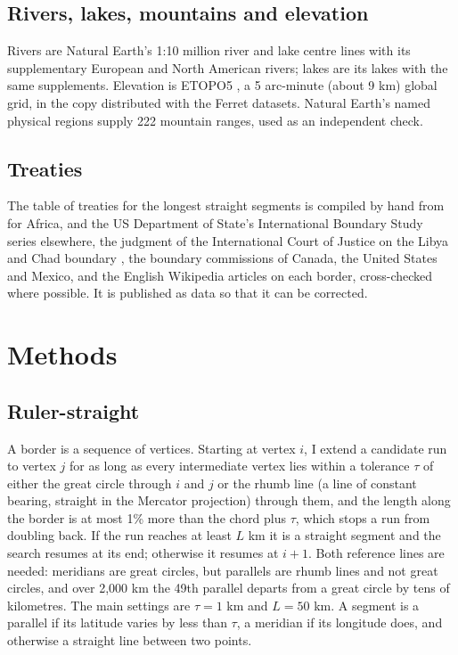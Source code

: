 \documentclass[11pt,a4paper]{article}
\begin{document}
\subsection{Rivers, lakes, mountains and elevation}
Rivers are Natural Earth's 1:10 million river and lake centre lines with its supplementary European and North American rivers; lakes are its lakes with the same supplements. Elevation is ETOPO5 \citep{etopo5}, a 5 arc-minute (about 9 km) global grid, in the copy distributed with the Ferret datasets. Natural Earth's named physical regions supply 222 mountain ranges, used as an independent check.

\subsection{Treaties}
The table of treaties for the longest straight segments is compiled by hand from \citet{brownlie1979} for Africa, \citet{biger1995} and the US Department of State's International Boundary Study series elsewhere, the judgment of the International Court of Justice on the Libya and Chad boundary \citep{icj1994}, the boundary commissions of Canada, the United States and Mexico, and the English Wikipedia articles on each border, cross-checked where possible. It is published as data so that it can be corrected.

\section{Methods}
\subsection{Ruler-straight}
A border is a sequence of vertices. Starting at vertex $i$, I extend a candidate run to vertex $j$ for as long as every intermediate vertex lies within a tolerance $\tau$ of either the great circle through $i$ and $j$ or the rhumb line (a line of constant bearing, straight in the Mercator projection) through them, and the length along the border is at most 1\% more than the chord plus $\tau$, which stops a run from doubling back. If the run reaches at least $L$ km it is a straight segment and the search resumes at its end; otherwise it resumes at $i+1$. Both reference lines are needed: meridians are great circles, but parallels are rhumb lines and not great circles, and over 2,000 km the 49th parallel departs from a great circle by tens of kilometres. The main settings are $\tau = 1$ km and $L = 50$ km. A segment is a parallel if its latitude varies by less than $\tau$, a meridian if its longitude does, and otherwise a straight line between two points.
\end{document}
